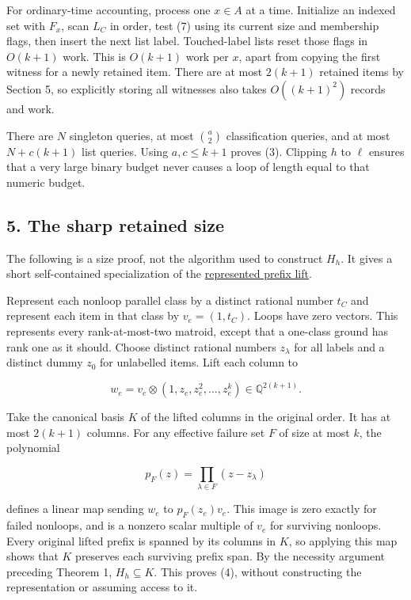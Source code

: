 For ordinary-time accounting, process one \(x\in A\) at a time. Initialize an indexed set with \(F_x\), scan \(L_C\) in order, test (7) using its current size and membership flags, then insert the next list label. Touched-label lists reset those flags in \(O(k+1)\) work. This is \(O(k+1)\) work per \(x\), apart from copying the first witness for a newly retained item. There are at most \(2(k+1)\) retained items by Section 5, so explicitly storing all witnesses also takes \(O((k+1)^2)\) records and work.

There are \(N\) singleton queries, at most \(\binom a2\) classification queries, and at most \(N+c(k+1)\) list queries. Using \(a,c\le k+1\) proves (3). Clipping \(h\) to \(\ell\) ensures that a very large binary budget never causes a loop of length equal to that numeric budget.

\hypertarget{af-b41875cb6e-the-sharp-retained-size}{%
\subsection{5. The sharp retained size}\label{af-b41875cb6e-the-sharp-retained-size}}

The following is a size proof, not the algorithm used to construct \(H_h\). It gives a short self-contained specialization of the \href{https://github.com/icekylinx/algorithm-frontier/blob/main/problems/matroid-failure-summaries/manuscripts/sharp-represented-matroid-failure-summaries.md}{represented prefix lift}.

Represent each nonloop parallel class by a distinct rational number \(t_C\) and represent each item in that class by \(v_e=(1,t_C)\). Loops have zero vectors. This represents every rank-at-most-two matroid, except that a one-class ground has rank one as it should. Choose distinct rational numbers \(z_\lambda\) for all labels and a distinct dummy \(z_0\) for unlabelled items. Lift each column to

\[
w_e=v_e\otimes(1,z_e,z_e^2,\ldots,z_e^k)
\in\mathbb Q^{2(k+1)}.
\tag{8}
\]

Take the canonical basis \(K\) of the lifted columns in the original order. It has at most \(2(k+1)\) columns. For any effective failure set \(F\) of size at most \(k\), the polynomial

\[
p_F(z)=\prod_{\lambda\in F}(z-z_\lambda)
\]

defines a linear map sending \(w_e\) to \(p_F(z_e)v_e\). This image is zero exactly for failed nonloops, and is a nonzero scalar multiple of \(v_e\) for surviving nonloops. Every original lifted prefix is spanned by its columns in \(K\), so applying this map shows that \(K\) preserves each surviving prefix span. By the necessity argument preceding Theorem 1, \(H_h\subseteq K\). This proves (4), without constructing the representation or assuming access to it.

